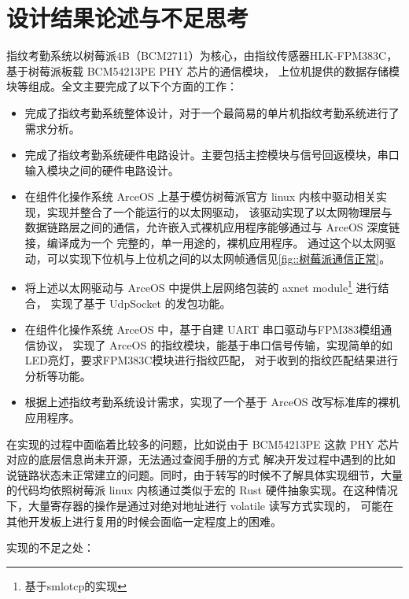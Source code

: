 \section{设计结果论述与不足思考}

    指纹考勤系统以树莓派4B（BCM2711）为核心，由指纹传感器HLK-FPM383C，基于树莓派板载 BCM54213PE PHY 芯片的通信模块，
    上位机提供的数据存储模块等组成。全文主要完成了以下个方面的工作：

    \begin{itemize}
        \item 完成了指纹考勤系统整体设计，对于一个最简易的单片机指纹考勤系统进行了需求分析。
        \item 完成了指纹考勤系统硬件电路设计。主要包括主控模块与信号回返模块，串口输入模块之间的硬件电路设计。
        \item 在组件化操作系统 ArceOS 上基于模仿树莓派官方 linux 内核中驱动相关实现，实现并整合了一个能运行的以太网驱动，
            该驱动实现了以太网物理层与数据链路层之间的通信，允许嵌入式裸机应用程序能够通过与 ArceOS 深度链接，编译成为一个
            完整的，单一用途的，裸机应用程序。
            通过这个以太网驱动，可以实现下位机与上位机之间的以太网帧通信见\ref{fig::树莓派通信正常}。
        \item 将上述以太网驱动与 ArceOS 中提供上层网络包装的 axnet module\footnote{基于smlotcp的实现} 进行结合，
            实现了基于 UdpSocket 的发包功能。
        \item 在组件化操作系统 ArceOS 中，基于自建 UART 串口驱动与FPM383模组通信协议\cite{noauthor_fpm383c_nodate}，
            实现了 ArceOS 的指纹模块，能基于串口信号传输，实现简单的如LED亮灯，要求FPM383C模块进行指纹匹配，
            对于收到的指纹匹配结果进行分析等功能。
        \item 根据上述指纹考勤系统设计需求，实现了一个基于 ArceOS 改写标准库的裸机应用程序。
    \end{itemize}

    在实现的过程中面临着比较多的问题，比如说由于 BCM54213PE 这款 PHY 芯片对应的底层信息尚未开源，无法通过查阅手册的方式
    解决开发过程中遇到的比如说链路状态未正常建立的问题。同时，由于转写的时候不了解具体实现细节，大量的代码均依照树莓派 linux
    内核通过类似于宏的 Rust 硬件抽象实现。在这种情况下，大量寄存器的操作是通过对绝对地址进行 volatile 读写方式实现的，
    可能在其他开发板上进行复用的时候会面临一定程度上的困难。

    实现的不足之处：

